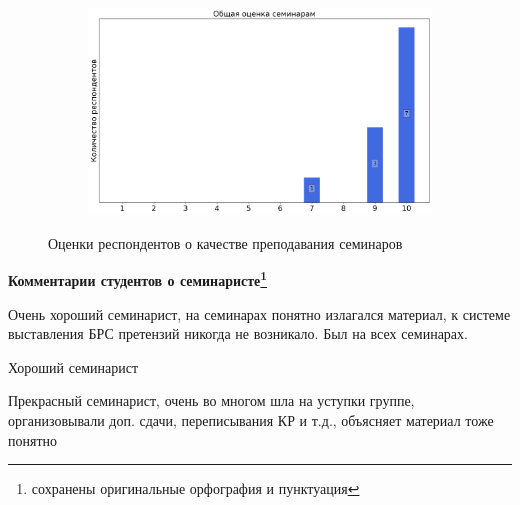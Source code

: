 \begin{figure}[H]
\begin{subfigure}[b]{0.45\textwidth}
			\end{subfigure}
			\begin{subfigure}[b]{0.45\textwidth}
				\centering
				\includegraphics[width=\textwidth]{images/3 course/ТФКП/seminarists-marks-Лопушански М.С.-3.png}
			\end{subfigure}	
			\caption{Оценки респондентов о качестве преподавания семинаров}
		\end{figure}

		\textbf{Комментарии студентов о семинаристе\protect\footnote{сохранены оригинальные орфография и пунктуация}}
            \begin{commentbox} 
                Очень хороший семинарист, на семинарах понятно излагался материал, к системе выставления БРС претензий никогда не возникало. Был на всех семинарах. 
            \end{commentbox} 
        
            \begin{commentbox} 
                Хороший семинарист 
            \end{commentbox} 
        
            \begin{commentbox} 
                Прекрасный семинарист, очень во многом шла на уступки группе, организовывали доп. сдачи, переписывания КР и т.д., объясняет материал тоже понятно 
            \end{commentbox} 


